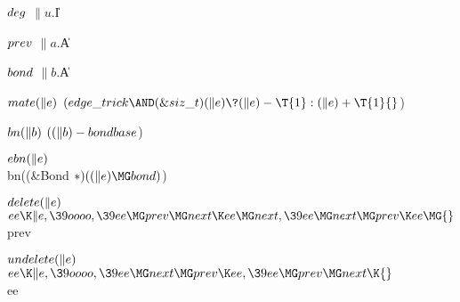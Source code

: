 \Y\B\4\D$\\{deg}$ \5
$\|u.{}$\|I%
\par
\B\4\D$\\{prev}$ \5
$\|a.{}$\|A\par
\B\4\D$\\{bond}$ \5
$\|b.{}$\|A\par
\B\4\D$\\{mate}(\|e)$ \5
$(\\{edge\_trick}\AND(\&{siz\_t})(\|e)\?(\|e)-\T{1}:(\|e)+\T{1}{}$)\par
\B\4\D$\\{bn}(\|b)$ \5
$((\|b)-\\{bondbase}{}$)\par
\B\4\D$\\{ebn}(\|e)$ \5
\\{bn}((\&{Bond} ${}{*})((\|e)\MG\\{bond}){}$)\par
\B\4\D$\\{delete}(\|e)$ \5
$\\{ee}\K\|e,\39\\{oooo},\39\\{ee}\MG\\{prev}\MG\\{next}\K\\{ee}\MG\\{next},\39%
\\{ee}\MG\\{next}\MG\\{prev}\K\\{ee}\MG{}$\\{prev}\par
\B\4\D$\\{undelete}(\|e)$ \5
$\\{ee}\K\|e,\39\\{oooo},\39\\{ee}\MG\\{next}\MG\\{prev}\K\\{ee},\39\\{ee}\MG%
\\{prev}\MG\\{next}\K{}$\\{ee}\par
\fi

